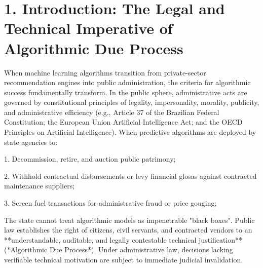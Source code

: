 \documentclass[10pt,a4paper,journal]{article}
\begin{document}
\begin{abstract}
0.0085, multiseed Jaccard stability J = 0.8055) operating under an immutable SHA-256 cryptographic chain of custody isolates 662 anomalous work orders (R\$ 16,581,420.50) and 13,936 anomalous fueling events. This work provides public audit bodies with an epistemologically sound, legally defensible framework for AI governance.

**Keywords:** Explainable Artificial Intelligence (XAI); Algorithmic Due Process; SHAP vs LIME Disagreement; Complex Networks; Bipartite Graphs; Public Procurement Audit; Isolation Forest.

---

\end{abstract}

\section{1. Introduction: The Legal and Technical Imperative of Algorithmic Due Process}
When machine learning algorithms transition from private-sector recommendation engines into public administration, the criteria for algorithmic success fundamentally transform. In the public sphere, administrative acts are governed by constitutional principles of legality, impersonality, morality, publicity, and administrative efficiency (e.g., Article 37 of the Brazilian Federal Constitution; the European Union Artificial Intelligence Act; and the OECD Principles on Artificial Intelligence). When predictive algorithms are deployed by state agencies to:

1. Decommission, retire, and auction public patrimony;

2. Withhold contractual disbursements or levy financial glosas against contracted maintenance suppliers;

3. Screen fuel transactions for administrative fraud or price gouging;

The state cannot treat algorithmic models as impenetrable "black boxes". Public law establishes the right of citizens, civil servants, and contracted vendors to an **understandable, auditable, and legally contestable technical justification** (*Algorithmic Due Process*). Under administrative law, decisions lacking verifiable technical motivation are subject to immediate judicial invalidation.
\end{document}
